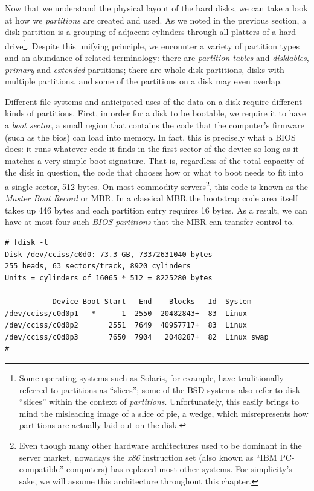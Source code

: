 Now that we understand the physical layout of the hard
disks, we can take a look at how we {\em partitions}
are created and used.  As we noted in the previous
section, a disk partition is a grouping of adjacent
cylinders through all platters of a hard
drive\footnote{Some operating systems such as Solaris,
for example, have traditionally referred to partitions
as ``slices''; some of the BSD systems also refer to
disk ``slices'' within the context of {\em
{} partitions}.  Unfortunately, this
easily brings to mind the misleading image of a slice
of pie, a wedge, which misrepresents how partitions
are actually laid out on the disk.}.  Despite this
unifying principle, we encounter a variety of
partition types and an abundance of related
terminology: there are {\em partition
tables} and {\em disklables},
{\em primary} and {\em
extended} partitions; there
are whole-disk partitions, disks with multiple
partitions, and some of the partitions on a disk may
even overlap.

Different file systems and anticipated uses of the
data on a disk require different kinds of partitions.
First, in order for a disk to be bootable, we require
it to have a {\em boot sector}, a
small region that contains the code that the
computer's firmware (such as the
\gls{bios}) can load into memory.  In
fact, this is precisely what a BIOS does: it runs
whatever code it finds in the first sector of the
device so long as it matches a very simple boot
signature.  That is, regardless
of the total capacity of the disk in question, the
code that chooses how or what to boot needs to fit
into a single sector, 512 bytes.  On most commodity
servers\footnote{Even though many other hardware
architectures used to be dominant in the server
market, nowadays the {\em x86} instruction set (also
known as ``IBM PC-compatible'' computers) has replaced
most other systems.  For simplicity's sake, we will
assume this architecture throughout this chapter.},
this code is known as the {\em Master Boot
Record} or MBR.  In a
classical MBR the bootstrap code area itself takes
up 446 bytes and each partition entry requires 16
bytes.  As a result, we can have at most four such
{\em BIOS partitions} that the
MBR can transfer control to.

\begin{lstlisting}[float,label=code:fdisk,caption=fdisk(8) sample invocation
and output on a Linux system]
# fdisk -l
Disk /dev/cciss/c0d0: 73.3 GB, 73372631040 bytes
255 heads, 63 sectors/track, 8920 cylinders
Units = cylinders of 16065 * 512 = 8225280 bytes

           Device Boot Start   End    Blocks   Id  System
/dev/cciss/c0d0p1   *      1  2550  20482843+  83  Linux
/dev/cciss/c0d0p2       2551  7649  40957717+  83  Linux
/dev/cciss/c0d0p3       7650  7904   2048287+  82  Linux swap
#
\end{lstlisting}

